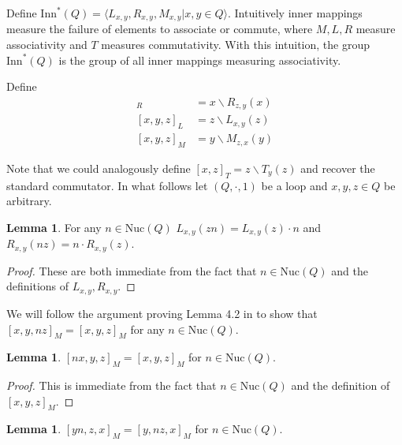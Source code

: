 \documentclass[12pt]{report}
\theoremstyle{definition}
\newtheorem{lem}[thm]{Lemma}
\newcommand{\ldv}{\backslash}       %
\newcommand{\nuc}{\text{Nuc}}       %
\newcommand{\inn}{\text{Inn}}       %
\begin{document}
Define $\inn^*(Q) = \langle L_{x, y}, R_{x, y}, M_{x, y} | x, y\in Q\rangle$. Intuitively inner
  mappings measure the failure of elements to associate or commute, where $M, L, R$ measure
  associativity and $T$ measures commutativity. With this intuition, the group $\inn^*(Q)$ is
  the group of all inner mappings measuring associativity.

Define
  \begin{align*}
    [x, y, z]_R &= x\ldv R_{z, y}(x)\\
    [x, y, z]_L &= z\ldv L_{x, y}(z)\\
    [x, y, z]_M &= y\ldv M_{z, x}(y)
  \end{align*}

Note that we could analogously define $[x, z]_T = z\ldv T_y(z)$ and recover the standard commutator.
  In what follows let $(Q, \cdot, 1)$ be a loop and $x, y, z\in Q$ be arbitrary.

\begin{lem}\label{lem-LR}
  For any $n\in\nuc(Q)$ $L_{x, y}(zn) = L_{x, y}(z)\cdot n$ and $R_{x, y}(nz) = n\cdot R_{x, y}(z)$.
\end{lem}

\begin{proof}
  These are both immediate from the fact that $n\in\nuc(Q)$ and the definitions of $L_{x, y}, R_{x, y}$.
\end{proof}

We will follow the argument proving Lemma 4.2 in \cite{DiaCC} to show that
  $[x, y, nz]_M = [x, y, z]_M$ for any $n\in\nuc(Q)$.
\begin{lem}\label{lem-M1}
  $[nx, y, z]_M = [x, y, z]_M$ for $n\in\nuc(Q)$.
\end{lem}

\begin{proof}
  This is immediate from the fact that $n\in\nuc(Q)$ and the definition of $[x, y, z]_M$.
\end{proof}

\begin{lem}\label{lem-M2}
  $[yn, z, x]_M = [y, nz, x]_M$ for $n\in\nuc(Q)$.
\end{lem}
\end{document}
